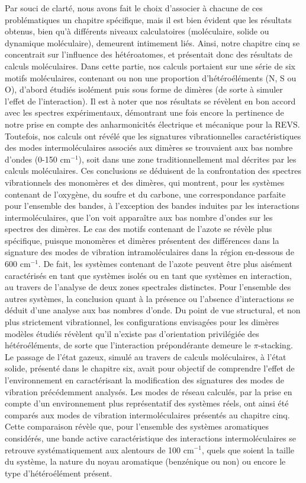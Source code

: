 	Par souci de clarté, nous avons fait le choix d'associer à chacune de ces problématiques un chapitre spécifique, mais il est bien évident que les résultats obtenus, bien qu'à différents niveaux calculatoires (moléculaire, solide ou dynamique moléculaire), demeurent intimement liés. 
	Ainsi, notre chapitre cinq se concentrait sur l'influence des hétéroatomes, et présentait donc des résultats de calculs moléculaires. Dans cette partie, nos calculs portaient sur une série de six motifs moléculaires, contenant ou non une proportion d'hétéroéléments (N, S ou O), d'abord étudiés isolément puis sous forme de dimères (de sorte à simuler l'effet de l'interaction). Il est à noter que nos résultats se révèlent en bon accord avec les spectres expérimentaux, démontrant une fois encore la pertinence de notre prise en compte des anharmonicités électrique et mécanique pour la REVS. Toutefois, nos calculs ont révélé que les signatures vibrationnelles caractéristiques des modes intermoléculaires associés aux dimères se trouvaient aux bas nombre d'ondes (0-150 cm$^{-1}$), soit dans une zone traditionnellement mal décrites par les calculs moléculaires. Ces conclusions se déduisent de la confrontation des spectres vibrationnels des monomères et des dimères, qui montrent, pour les systèmes contenant de l'oxygène, du soufre et du carbone, une correspondance parfaite pour l'ensemble des bandes, à l'exception des bandes induites par les interactions intermoléculaires, que l'on voit apparaître aux bas nombre d'ondes sur les spectres des dimères. Le cas des motifs contenant de l'azote se révèle plus spécifique, puisque monomères et dimères présentent des différences dans la signature des modes de vibration intramoléculaires dans la région en-dessous de 600 cm$^{-1}$. De fait, les systèmes contenant de l'azote peuvent être plus aisément caractérisés en tant que systèmes isolés ou en tant que systèmes en interaction, au travers de l'analyse de deux zones spectrales distinctes. Pour l'ensemble des autres systèmes, la conclusion quant à la présence ou l'absence d'interactions se déduit d'une analyse aux bas nombres d'onde. 	
Du point de vue structural, et non plus strictement vibrationnel, les configurations envisagées pour les dimères modèles étudiés révèlent qu'il n'existe pas d'orientation privilégiée des hétéroéléments, de sorte que l'interaction prépondérante demeure le $\pi$-stacking.\\ 	

	
	Le passage de l'état gazeux, simulé au travers de calculs moléculaires, à l'état solide, présenté dans le chapitre six, avait pour objectif de comprendre l'effet de l'environnement en caractérisant la modification des signatures des modes de vibration précédemment analysés. Les modes de réseau calculés, par la prise en compte d'un environnement plus représentatif des systèmes réels, ont ainsi été comparés aux modes de vibration intermoléculaires présentés au chapitre cinq. Cette comparaison révèle que, pour l'ensemble des systèmes aromatiques considérés, une bande active caractéristique des interactions intermoléculaires se retrouve systématiquement aux alentours de 100 cm$^{-1}$, quels que soient la taille du système, la nature du noyau aromatique (benzénique ou non) ou encore le type d'hétéroélément présent.\\ 

